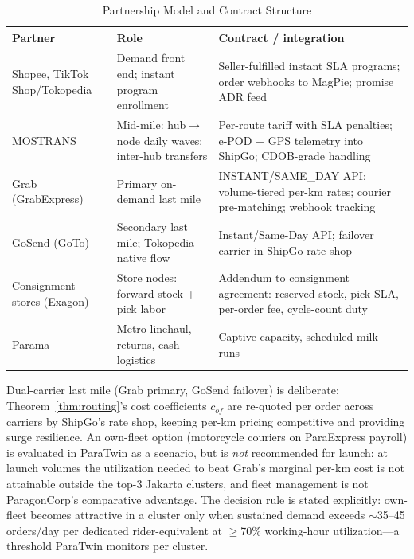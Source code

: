 \documentclass[journal]{IEEEtran}
\begin{document}
\begin{table}[!t]
\caption{Partnership Model and Contract Structure}
\label{tab:partners}
\centering
\scriptsize
\begin{tabularx}{\columnwidth}{@{}l X X@{}}
\toprule
\textbf{Partner} & \textbf{Role} & \textbf{Contract / integration} \\
\midrule
Shopee, TikTok Shop/Tokopedia & Demand front end; instant program enrollment & Seller-fulfilled instant SLA programs; order webhooks to MagPie; promise ADR feed \\
MOSTRANS & Mid-mile: hub$\to$node daily waves; inter-hub transfers & Per-route tariff with SLA penalties; e-POD + GPS telemetry into ShipGo; CDOB-grade handling \\
Grab (GrabExpress) & Primary on-demand last mile & INSTANT/SAME\_DAY API; volume-tiered per-km rates; courier pre-matching; webhook tracking \\
GoSend (GoTo) & Secondary last mile; Tokopedia-native flow & Instant/Same-Day API; failover carrier in ShipGo rate shop \\
Consignment stores (Exagon) & Store nodes: forward stock + pick labor & Addendum to consignment agreement: reserved stock, pick SLA, per-order fee, cycle-count duty \\
Parama & Metro linehaul, returns, cash logistics & Captive capacity, scheduled milk runs \\
\bottomrule
\end{tabularx}
\end{table}

Dual-carrier last mile (Grab primary, GoSend failover) is deliberate: Theorem~\ref{thm:routing}'s cost coefficients $c_{of}$ are re-quoted per order across carriers by ShipGo's rate shop, keeping per-km pricing competitive and providing surge resilience. An own-fleet option (motorcycle couriers on ParaExpress payroll) is evaluated in ParaTwin as a scenario, but is \emph{not} recommended for launch: at launch volumes the utilization needed to beat Grab's marginal per-km cost is not attainable outside the top-3 Jakarta clusters, and fleet management is not ParagonCorp's comparative advantage. The decision rule is stated explicitly: own-fleet becomes attractive in a cluster only when sustained demand exceeds ${\sim}$35--45 orders/day per dedicated rider-equivalent at $\ge$70\% working-hour utilization---a threshold ParaTwin monitors per cluster.
\end{document}
